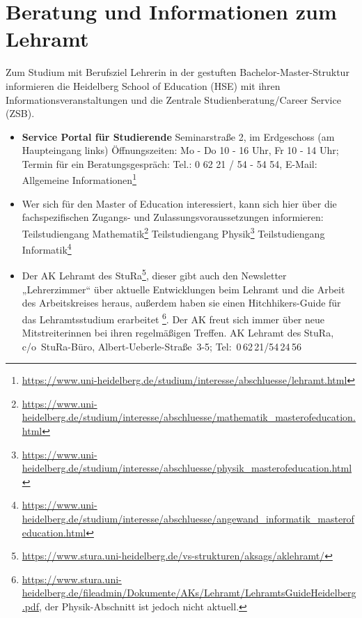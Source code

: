\section{Beratung und Informationen zum Lehramt}
\label{lehramtkontakte}

Zum Studium mit Berufsziel Lehrerin in der gestuften Bachelor-Master-Struktur informieren die Heidelberg School of Education (HSE) mit ihren Informationsveranstaltungen und die Zentrale Studienberatung/Career Service (ZSB).
\begin{itemize}
    \item \textbf{Service Portal für Studierende} \newline
          Seminarstraße 2, im Erdgeschoss (am Haupteingang links)
          Öffnungszeiten: Mo - Do 10 - 16 Uhr, Fr 10 - 14 Uhr; \newline
          Termin für ein Beratungsgespräch: Tel.: 0 62 21 / 54 - 54 54, E-Mail:  \newline
          Allgemeine Informationen\footnote{\url{https://www.uni-heidelberg.de/studium/interesse/abschluesse/lehramt.html}}

    \item Wer sich für den Master of Education interessiert, kann sich hier über die fachspezifischen Zugangs- und Zulassungsvoraussetzungen informieren: \newline
          Teilstudiengang Mathematik\footnote{\url{https://www.uni-heidelberg.de/studium/interesse/abschluesse/mathematik_masterofeducation.html}} \newline
          Teilstudiengang Physik\footnote{\url{https://www.uni-heidelberg.de/studium/interesse/abschluesse/physik_masterofeducation.html}} \newline
          Teilstudiengang Informatik\footnote{\url{https://www.uni-heidelberg.de/studium/interesse/abschluesse/angewand_informatik_masterofeducation.html}}

    \item Der AK Lehramt des StuRa\footnote{\url{https://www.stura.uni-heidelberg.de/vs-strukturen/aksags/aklehramt/}}, dieser gibt auch den Newsletter „Lehrerzimmer“ über aktuelle Entwicklungen beim Lehramt und die Arbeit des Arbeitskreises heraus, außerdem haben sie einen Hitchhikers-Guide für das Lehramtsstudium erarbeitet \footnote{\url{https://www.stura.uni-heidelberg.de/fileadmin/Dokumente/AKs/Lehramt/LehramtsGuideHeidelberg.pdf}, der Physik-Abschnitt ist jedoch nicht aktuell.}. Der AK freut sich immer über neue Mitstreiterinnen bei ihren regelmäßigen Treffen.  \newline AK Lehramt des StuRa, c/o~StuRa-Büro, Albert-Ueberle-Straße~3-5; Tel:~0\,62\,21/54\,24\,56


\end{itemize}
